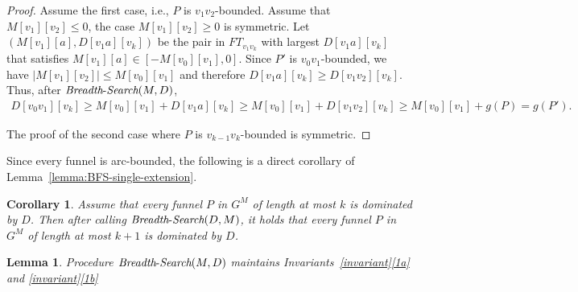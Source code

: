 \documentclass[11pt]{article}
\newtheorem{lemma}[theorem]{Lemma}
\newtheorem{corollary}[theorem]{Corollary}
\newcommand{\BFS}{\mbox{{\it Breadth}-{\it Search}}}
\begin{document}
\begin{proof}
    Assume the first case, i.e., $P$ is $v_1 v_2$-bounded. Assume that $M[v_1][v_2] \le 0$, the case $M[v_1][v_2]\ge 0$ is symmetric.
    Let $(M[v_1][a] , D[v_1 a][v_k])$ be the pair in $FT_{v_1 v_k}$ with largest $D[v_1 a][v_k]$ that satisfies $M[v_1][a] \in [- M[v_0][v_1],0]$. Since $P'$ is $v_0 v_1$-bounded, we have $|M[v_1][v_2]| \le M[v_0][v_1]$ and therefore $D[v_1 a][v_k] \ge D[v_1 v_2][v_k]$. Thus, after $\BFS(M,D)$, 
    \begin{align*}
        D[v_0 v_1][v_k] \ge M[v_0][v_1] + D[v_1 a][v_k] \ge M[v_0][v_1] +  D[v_1 v_2][v_k] \ge M[v_0][v_1] + g(P) = g(P').
    \end{align*}

    The proof of the second case where $P$ is $v_{k-1}v_k$-bounded is symmetric.
\end{proof}

Since every funnel is arc-bounded, the following is a direct corollary of Lemma~\ref{lemma:BFS-single-extension}.

\begin{corollary}\label{lemma:BFS-basic}
    Assume that every funnel $P$ in $G^M$ of length at most $k$ is dominated by $D$.
    Then after calling $\BFS(D,M)$, it holds that every funnel $P$ in $G^M$ of length at most $k+1$ is dominated by $D$.
\end{corollary}

\begin{lemma}
    Procedure $\BFS(M,D)$ maintains Invariants~\ref{invariant}\ref{1a} and \ref{invariant}\ref{1b}
\end{lemma}
\end{document}
